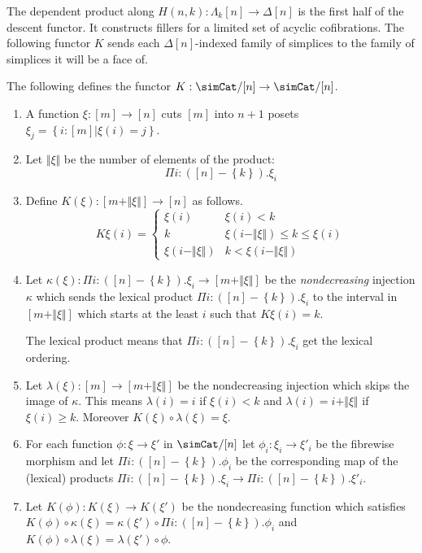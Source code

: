 \documentclass{tac}
\newcommand\set[1]{\left\{#1\right\}}
\newcommand\dual{^{\mathrm{op}}}
\newcommand\s{^{\simCat\dual}}
\newcommand\of{:}
\newcommand\simplex\Delta
\newcommand\horn\Lambda
\newcommand\norm[1]{\Vert #1 \Vert}
\newcommand\ka\kappa
\newcommand\la\lambda
\newcommand\ambient{\mathfrak A}
\begin{document}

The dependent product along $H(n,k)\of \horn_k[n]\to\simplex[n]$ is the first half of the descent functor. It constructs fillers for a limited set of acyclic cofibrations. The following functor $K$ sends each $\simplex[n]$-indexed family of simplices to the family of simplices it will be a face of.

\begin{definition}
The following defines the functor $K\of\simCat/[n]\to\simCat/[n]$.
\begin{enumerate}
\item A function $\xi\of[m]\to[n]$ cuts $[m]$ into $n+1$ posets $\xi_j = \set{i\of[m]|\xi(i)=j}$. 
\item Let $\norm \xi$ be the number of elements of the product: \[\Pi i\of ([n]-\set k).\xi_i\] 
\item Define $K(\xi)\of [m+\norm\xi]\to [n]$ as follows.
\[ 
	K\xi(i) = \left\{
		\begin{array}{cc}
			\xi(i) & \xi(i)<k \\
			k & \xi(i-\norm\xi)\leq k \leq \xi(i)\\
			\xi(i-\norm\xi) & k<\xi(i-\norm\xi)
		\end{array}
	\right.
\]
\item Let $\ka(\xi)\of\Pi i\of([n]-\set k).\xi_i \to [m+\norm\xi]$ be the \emph{nondecreasing} injection $\ka$ which sends the lexical product $\Pi i\of([n]-\set k).\xi_i$ to the interval in $[m+\norm\xi]$ which starts at the least $i$ such that $K\xi(i)=k$.

The lexical product means that $\Pi i\of([n]-\set k).\xi_i$ get the lexical ordering. %

\item Let $\la(\xi)\of[m]\to[m+\norm\xi]$ be the nondecreasing injection which skips the image of $\ka$. This means $\la(i)=i$ if $\xi(i)<k$ and $\la(i)=i+\norm\xi$ if $\xi(i)\geq k$. Moreover $K(\xi)\circ\la(\xi) = \xi$.
\item For each function $\phi\of\xi\to\xi'$ in $\simCat/[n]$ let $\phi_i\of\xi_i\to\xi'_i$ be the fibrewise morphism and let $\Pi i\of([n]-\set k).\phi_i$ be the corresponding map of the (lexical) products $\Pi i\of([n]-\set k).\xi_i\to\Pi i\of([n]-\set k).\xi'_i$.
\item Let $K(\phi)\of K(\xi)\to K(\xi')$ be the nondecreasing function which satisfies $K(\phi)\circ \ka(\xi) = \ka(\xi')\circ \Pi i\of([n]-\set k).\phi_i$ and $K(\phi)\circ \la(\xi) = \la(\xi')\circ \phi$.
\end{enumerate}
\end{definition}
\end{document}
